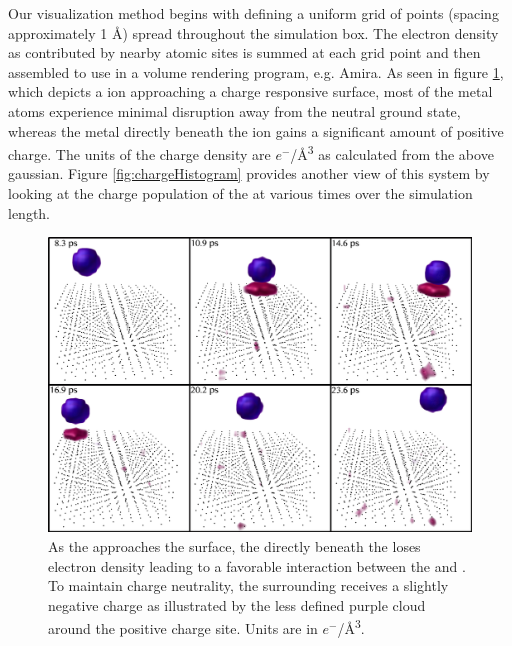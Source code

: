 Our visualization method begins with defining a uniform grid of points (spacing
approximately 1 \AA) spread throughout the simulation box. The electron density
as contributed by nearby atomic sites is summed at each grid point and then
assembled to use in a volume rendering program, e.g. Amira. As seen in figure
\ref{fig:chargeVol}, which depicts a  ion approaching a charge responsive
 surface, most of the metal atoms experience minimal disruption away
from the neutral ground state, whereas the metal directly beneath the 
ion gains a significant amount of positive charge. The units of the charge
density are $e^{-}$/\AA\textsuperscript{3} as calculated from the above gaussian.
Figure \ref{fig:chargeHistogram} provides another view of this system by
looking at the charge population of the  at various times over the
simulation length.

\begin{figure}
  \centering
  \includegraphics[width=0.75\linewidth]{../figures/chap5/PtOChargeVolume.pdf}
  \caption{As the  approaches the surface, the  directly beneath
the  loses electron density leading to a favorable interaction between
the  and . To maintain charge neutrality, the surrounding
 receives a slightly negative charge as illustrated by the less defined
purple cloud around the positive charge site. Units are in
$e^-$/\AA\textsuperscript{3}.}
\label{fig:chargeVol}
\end{figure}

